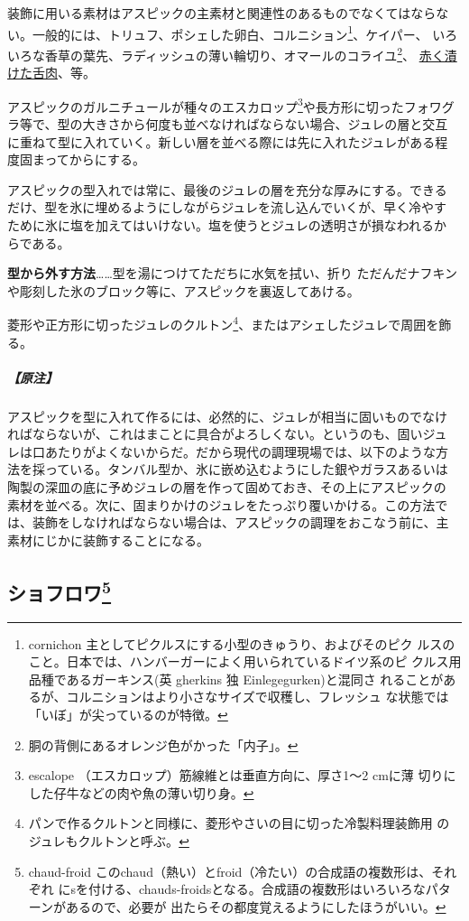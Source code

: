 装飾に用いる素材はアスピックの主素材と関連性のあるものでなくてはならな
い。一般的には、トリュフ、ポシェした卵白、コルニション\footnote{cornichon
  主としてピクルスにする小型のきゅうり、およびそのピク
  ルスのこと。日本では、ハンバーガーによく用いられているドイツ系のピ
  クルス用品種であるガーキンス(英 gherkins 独 Einlegegurken)と混同さ
  れることがあるが、コルニションはより小さなサイズで収穫し、フレッシュ
  な状態では「いぼ」が尖っているのが特徴。}、ケイパー、
いろいろな香草の葉先、ラディッシュの薄い輪切り、オマールのコライユ\footnote{胴の背側にあるオレンジ色がかった「内子」。}、
\protect\hyperlink{saumure-liquide-pour-langues}{赤く漬けた舌肉}、等。

アスピックのガルニチュールが種々のエスカロップ\footnote{escalope
  （エスカロップ）筋線維とは垂直方向に、厚さ1〜2 cmに薄
  切りにした仔牛などの肉や魚の薄い切り身。}や長方形に切ったフォワグ
ラ等で、型の大きさから何度も並べなければならない場合、ジュレの層と交互
に重ねて型に入れていく。新しい層を並べる際には先に入れたジュレがある程
度固まってからにする。

アスピックの型入れでは常に、最後のジュレの層を充分な厚みにする。できる
だけ、型を氷に埋めるようにしながらジュレを流し込んでいくが、早く冷やす
ために氷に塩を加えてはいけない。塩を使うとジュレの透明さが損なわれるか
らである。

\noindent\textbf{型から外す方法}\ldots{}\ldots{}型を湯につけてただちに水気を拭い、折り
ただんだナフキンや彫刻した氷のブロック等に、アスピックを裏返してあける。

菱形や正方形に切ったジュレのクルトン\footnote{パンで作るクルトンと同様に、菱形やさいの目に切った冷製料理装飾用
  のジュレもクルトンと呼ぶ。}、またはアシェしたジュレで周囲を飾 る。

\hypertarget{nota-aspics}{%
\subparagraph{【原注】}\label{nota-aspics}}

アスピックを型に入れて作るには、必然的に、ジュレが相当に固いものでなけ
ればならないが、これはまことに具合がよろしくない。というのも、固いジュ
レは口あたりがよくないからだ。だから現代の調理現場では、以下のような方
法を採っている。タンバル型か、氷に嵌め込むようにした銀やガラスあるいは
陶製の深皿の底に予めジュレの層を作って固めておき、その上にアスピックの
素材を並べる。次に、固まりかけのジュレをたっぷり覆いかける。この方法で
は、装飾をしなければならない場合は、アスピックの調理をおこなう前に、主
素材にじかに装飾することになる。

\hypertarget{chauds-froids}{%
\subsection[ショフロワ]{\texorpdfstring{ショフロワ\footnote{chaud-froid
  このchaud（熱い）とfroid（冷たい）の合成語の複数形は、それぞれ
  にsを付ける、chauds-froidsとなる。合成語の複数形はいろいろなパターンがあるので、必要が
  出たらその都度覚えるようにしたほうがいい。}}{ショフロワ}}\label{chauds-froids}}

